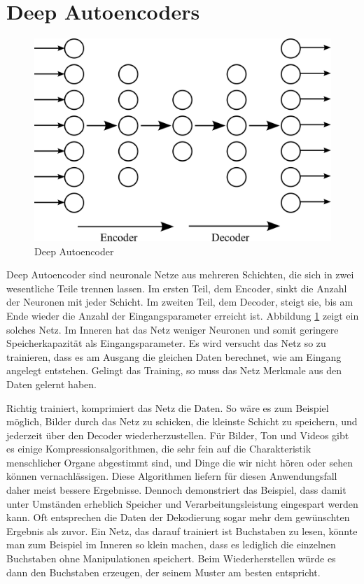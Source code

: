 \section{Deep Autoencoders}

\begin{figure}
	\centering
	\includegraphics[scale=1]{images/autoencoder.png}
	\caption{Deep Autoencoder}
	\label{fig:autoencoder}
\end{figure}

Deep Autoencoder sind neuronale Netze aus mehreren Schichten, die sich in zwei wesentliche Teile trennen lassen. Im ersten Teil, dem Encoder, sinkt die Anzahl der Neuronen mit jeder Schicht. Im zweiten Teil, dem Decoder, steigt sie, bis am Ende wieder die Anzahl der Eingangsparameter erreicht ist. Abbildung \ref{fig:autoencoder} zeigt ein solches Netz. Im Inneren hat das Netz weniger Neuronen und somit geringere Speicherkapazität als Eingangsparameter. Es wird versucht das Netz so zu trainieren, dass es am Ausgang die gleichen Daten berechnet, wie am Eingang angelegt entstehen. Gelingt das Training, so muss das Netz Merkmale aus den Daten gelernt haben.

Richtig trainiert, komprimiert das Netz die Daten. So wäre es zum Beispiel möglich, Bilder durch das Netz zu schicken, die kleinste Schicht zu speichern, und jederzeit über den Decoder wiederherzustellen. Für Bilder, Ton und Videos gibt es einige Kompressionsalgorithmen, die sehr fein auf die Charakteristik menschlicher Organe abgestimmt sind, und Dinge die wir nicht hören oder sehen können vernachlässigen. Diese Algorithmen liefern für diesen Anwendungsfall daher meist bessere Ergebnisse. Dennoch demonstriert das Beispiel, dass damit unter Umständen erheblich Speicher und Verarbeitungsleistung eingespart werden kann. Oft entsprechen die Daten der Dekodierung sogar mehr dem gewünschten Ergebnis als zuvor. Ein Netz, das darauf trainiert ist Buchstaben zu lesen, könnte man zum Beispiel im Inneren so klein machen, dass es lediglich die einzelnen Buchstaben ohne Manipulationen speichert. Beim Wiederherstellen würde es dann den Buchstaben erzeugen, der seinem Muster am besten entspricht.

